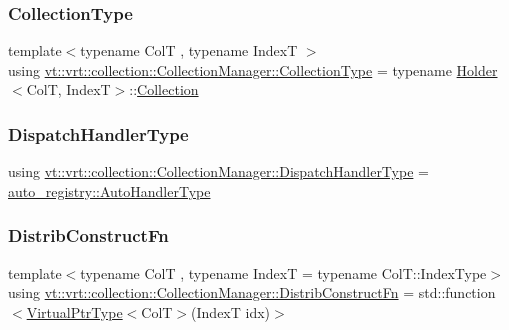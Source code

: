 \subsubsection{\texorpdfstring{Collection\+Type}{CollectionType}}
{\footnotesize\ttfamily template$<$typename ColT , typename IndexT $>$ \\
using \hyperlink{structvt_1_1vrt_1_1collection_1_1_collection_manager_ad20a11229c9e9efe69135c207047bf85}{vt\+::vrt\+::collection\+::\+Collection\+Manager\+::\+Collection\+Type} =  typename \hyperlink{structvt_1_1vrt_1_1collection_1_1_holder}{Holder}$<$ColT, IndexT$>$\+::\hyperlink{structvt_1_1vrt_1_1collection_1_1_collection}{Collection}}

\mbox{\label{structvt_1_1vrt_1_1collection_1_1_collection_manager_a0cfe02a0426e95ec9daa2ef7374e07c7}} 
\subsubsection{\texorpdfstring{Dispatch\+Handler\+Type}{DispatchHandlerType}}
{\footnotesize\ttfamily using \hyperlink{structvt_1_1vrt_1_1collection_1_1_collection_manager_a0cfe02a0426e95ec9daa2ef7374e07c7}{vt\+::vrt\+::collection\+::\+Collection\+Manager\+::\+Dispatch\+Handler\+Type} =  \hyperlink{namespacevt_1_1auto__registry_ae295e18699146815bb7d7674594d95d7}{auto\+\_\+registry\+::\+Auto\+Handler\+Type}}

\mbox{\label{structvt_1_1vrt_1_1collection_1_1_collection_manager_a7503830bc133013d542856fa39834dcc}} 
\subsubsection{\texorpdfstring{Distrib\+Construct\+Fn}{DistribConstructFn}}
{\footnotesize\ttfamily template$<$typename ColT , typename IndexT  = typename Col\+T\+::\+Index\+Type$>$ \\
using \hyperlink{structvt_1_1vrt_1_1collection_1_1_collection_manager_a7503830bc133013d542856fa39834dcc}{vt\+::vrt\+::collection\+::\+Collection\+Manager\+::\+Distrib\+Construct\+Fn} =  std\+::function$<$\hyperlink{structvt_1_1vrt_1_1collection_1_1_collection_manager_a1da9015e52d6ecca955f57b59aab0b82}{Virtual\+Ptr\+Type}$<$ColT$>$(IndexT idx)$>$}


